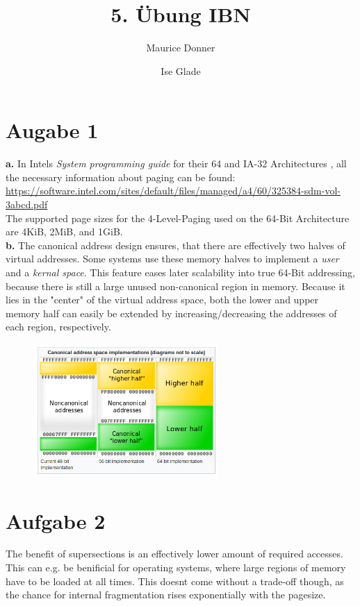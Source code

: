 \documentclass{article}
\title{\textsf{\color{blue!40!black}5. Übung IBN}}
\author{Maurice Donner \and Ise Glade}
\begin{document}
\maketitle
\newpage

\section*{Augabe 1}
\textbf{a.} 
In Intels \textit{System programming guide} for their 64 and IA-32 Architectures
, all the necessary information about paging can be found:
\url{https://software.intel.com/sites/default/files/managed/a4/60/325384-sdm-vol-3abcd.pdf}\\
The supported page sizes for the 4-Level-Paging used on the 64-Bit
Architecture are 4KiB, 2MiB, and 1GiB. \\

\textbf{b.}
The canonical address design ensures, that there are effectively two
halves of virtual addresses. Some systems use these memory halves to
implement a \textit{user} and a \textit{kernal space}. This feature eases
later scalability into true 64-Bit addressing, because there is still a large
unused non-canonical region in memory. Because it lies in the "center" of the
virtual address space, both the lower and upper memory half can easily be
extended by increasing/decreasing the addresses of each region, respectively.
\begin{figure}[H]
    \centering
    \includegraphics[width=7cm]{Canonical.png}
\end{figure}

\section*{Aufgabe 2} 
The benefit of supersections is an effectively lower amount of
required accesses. This can e.g. be benificial for operating systems,
where large regions of memory have to be loaded at all times.
This doesnt come without a trade-off though, as the chance for
internal fragmentation rises exponentially with the pagesize.
\end{document}
